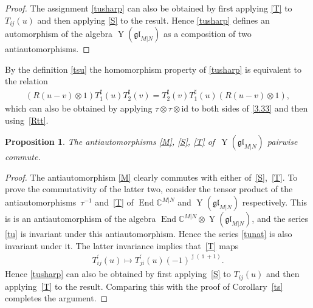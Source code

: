 \documentclass[10pt,a4paper]{amsart}
\numberwithin{equation}{section}
\newtheorem{Proposition}[Theorem]{Proposition}
\def\1{^{-1}}
\def\bi{{\bar\imath }}
\def\bj{{\bar\jmath }}
\def\CC{{\mathbb{C}}}
\def\CMN{\CC^{M|N}}
\def\End{\operatorname{End}}
\def\glMN{\mathfrak{gl}_{M|N}}
\def\id{{\mathrm{id}}}
\def\ot{\otimes}
\def\TP{T^{\prime}}
\def\TS{T^{\sharp}}
\def\YMN{\operatorname{Y}(\glMN)}
\begin{document}
\begin{proof}
The assignment \eqref{tusharp} can also be obtained by first applying
\eqref{T} to $T_{ij}(u)$ and then applying \eqref{S} to the result.
Hence \eqref{tusharp} defines an automorphism of the algebra
$\YMN$ as a composition of two antiautomorphisms.
\end{proof}

By the definition \eqref{tsu} the homomorphism property of %
\eqref{tusharp} is equivalent to the relation
\begin{gather}
\label{3.333}
(R (u-v)\ot1) \TS_1(u) \TS_2(v)=
\TS_2(v) \TS_1(u)(R (u-v)\ot1),
\end{gather}
which can also be obtained by applying
$\tau\ot\tau\ot\id$ to both sides of \eqref{3.33}
and then using~\eqref{Rtt}.

\begin{Proposition}\label{mst}
The antiautomorphisms \eqref{M}, \eqref{S}, \eqref{T} of~$\YMN$ pairwise commute.
\end{Proposition}

\begin{proof}The antiautomorphism \eqref{M} clearly commutes with either of~\eqref{S},~\eqref{T}.
To prove the commutativity of the latter two, consider the tensor product of the antiautomorphisms~$\tau\1$ and~\eqref{T}
of $\End\CMN$ and $\YMN$ respectively. This is
is an antiautomorphism of the
algebra $\End\CMN\ot\YMN $, and the series \eqref{tu} is invariant
under this antiautomorphism. Hence the series \eqref{tunat}
is also invariant under it.
The latter invariance implies that~\eqref{T} maps
\begin{gather*}%
\TP_{ij}(u)\mapsto\TP_{ji}(u) {(-1)}^{\bj ( \bi + 1)} .
\end{gather*}
Hence \eqref{tusharp} can also be obtained by first applying~\eqref{S} to $T_{ij}(u)$ and then applying~\eqref{T} to the result.
Comparing this with the proof of Corollary~\ref{ts} completes the argument.
\end{proof}
\end{document}
